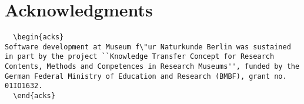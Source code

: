 \documentclass[manuscript,screen,review]{acmart}
\begin{document}
\section{Acknowledgments}
\begin{verbatim}
  \begin{acks}
Software development at Museum f\"ur Naturkunde Berlin was sustained in part by the project ``Knowledge Transfer Concept for Research Contents, Methods and Competences in Research Museums'', funded by the German Federal Ministry of Education and Research (BMBF), grant no. 01IO1632.
  \end{acks}
\end{verbatim}
\end{document}
